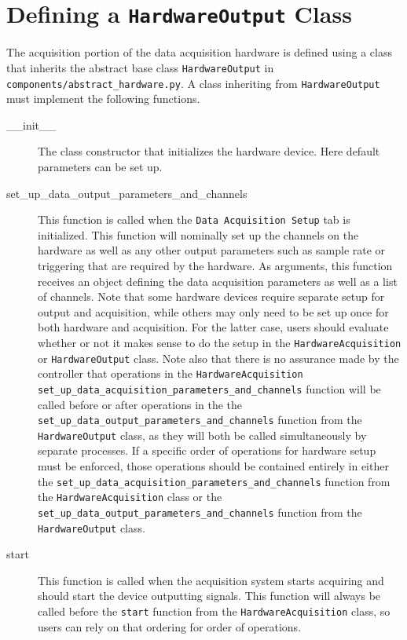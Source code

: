 \documentclass[pdf,12pt,report]{SANDreport}
\newcommand{\inlineCode}{\lstinline[basicstyle=\bfseries\ttfamily]}
\begin{document}
    \section{Defining a \inlineCode{HardwareOutput} Class}
    The acquisition portion of the data acquisition hardware is defined using a class that inherits the abstract base class \inlineCode{HardwareOutput} in \inlineCode{components/abstract_hardware.py}.  A class inheriting from \inlineCode{HardwareOutput} must implement the following functions.
    \begin{description}
        \item[\_\_init\_\_] The class constructor that initializes the hardware device.  Here default parameters can be set up.
        \item[set\_up\_data\_output\_parameters\_and\_channels] This function is called when the \inlineCode{Data Acquisition Setup} tab is initialized.  This function will nominally set up the channels on the hardware as well as any other output parameters such as sample rate or triggering that are required by the hardware.  As arguments, this function receives an object defining the data acquisition parameters as well as a list of channels.  Note that some hardware devices require separate setup for output and acquisition, while others may only need to be set up once for both hardware and acquisition.  For the latter case, users should evaluate whether or not it makes sense to do the setup in the \inlineCode{HardwareAcquisition} or \inlineCode{HardwareOutput} class.  Note also that there is no assurance made by the controller that operations in the \inlineCode{HardwareAcquisition} \inlineCode{set_up_data_acquisition_parameters_and_channels} function will be called before or after operations in the the \inlineCode{set_up_data_output_parameters_and_channels} function from the \inlineCode{HardwareOutput} class, as they will both be called simultaneously by separate processes.  If a specific order of operations for hardware setup must be enforced, those operations should be contained entirely in either the \inlineCode{set_up_data_acquisition_parameters_and_channels} function from the \inlineCode{HardwareAcquisition} class or the \inlineCode{set_up_data_output_parameters_and_channels} function from the \inlineCode{HardwareOutput} class.
        \item[start] This function is called when the acquisition system starts acquiring and should start the device outputting signals.  This function will always be called before the \inlineCode{start} function from the \inlineCode{HardwareAcquisition} class, so users can rely on that ordering for order of operations.

\end{description}
\end{document}
